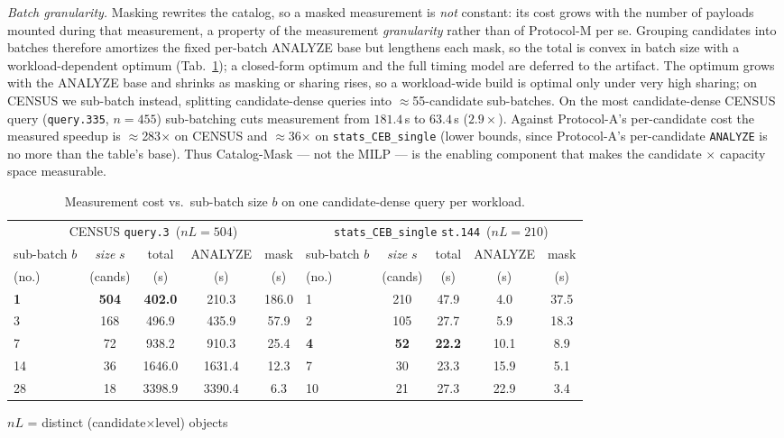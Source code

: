 \documentclass[sigconf, nonacm]{acmart}
\begin{document}
\emph{Batch granularity.}
Masking rewrites the catalog, so a masked measurement is \emph{not} constant:
its cost grows with the number of payloads mounted during that measurement, a
property of the measurement \emph{granularity} rather than of Protocol-M per se.
Grouping candidates into batches therefore amortizes the fixed per-batch ANALYZE
base but lengthens each mask, so the total is convex in batch size with a
workload-dependent optimum (Tab.~\ref{tab:measurement}); a closed-form optimum
and the full timing model are deferred to the artifact. The optimum grows with
the ANALYZE base and shrinks as masking or sharing rises, so a workload-wide
build is optimal only under very high sharing; on CENSUS we sub-batch instead,
splitting candidate-dense queries into $\approx$55-candidate sub-batches. On the
most candidate-dense CENSUS query (\texttt{query.335}, $n{=}455$) sub-batching
cuts measurement from $181.4$\,s to $63.4$\,s ($2.9\times$). Against
Protocol-A's per-candidate cost the measured speedup is $\approx$283$\times$ on
CENSUS and $\approx$36$\times$ on \texttt{stats\_CEB\_single} (lower bounds,
since Protocol-A's per-candidate \texttt{ANALYZE} is no more than the table's
base). Thus Catalog-Mask --- not the MILP --- is the enabling component that
makes the candidate $\times$ capacity space measurable.

\begin{table}[t]
\caption{Measurement cost vs.\ sub-batch size $b$ on one candidate-dense query
per workload.}
\label{tab:measurement}
\small
\begin{tabular}{lcccc@{\hskip 6pt}lcccc}
\toprule
\multicolumn{5}{c}{CENSUS \texttt{query.3}\ ($nL{=}504$)} &
\multicolumn{5}{c}{\texttt{stats\_CEB\_single} \texttt{st.144}\ ($nL{=}210$)}\\
\cmidrule(lr){1-5}\cmidrule(lr){6-10}
sub-batch $b$ & \emph{size} $s$ & total & ANALYZE & mask &
sub-batch $b$ & \emph{size} $s$ & total & ANALYZE & mask\\
(no.) & (cands) & (s) & (s) & (s) &
(no.) & (cands) & (s) & (s) & (s)\\
\midrule
\textbf{1} & \textbf{504} & \textbf{402.0} & 210.3 & 186.0 &
1 & 210 & 47.9 & 4.0 & 37.5\\
3 & 168 & 496.9 & 435.9 & 57.9 &
2 & 105 & 27.7 & 5.9 & 18.3\\
7 & 72 & 938.2 & 910.3 & 25.4 &
\textbf{4} & \textbf{52} & \textbf{22.2} & 10.1 & 8.9\\
14 & 36 & 1646.0 & 1631.4 & 12.3 &
7 & 30 & 23.3 & 15.9 & 5.1\\
28 & 18 & 3398.9 & 3390.4 & 6.3 &
10 & 21 & 27.3 & 22.9 & 3.4\\
\bottomrule
\end{tabular}

{\footnotesize $nL$ = distinct (candidate$\times$level) objects}
\end{table}
\end{document}
